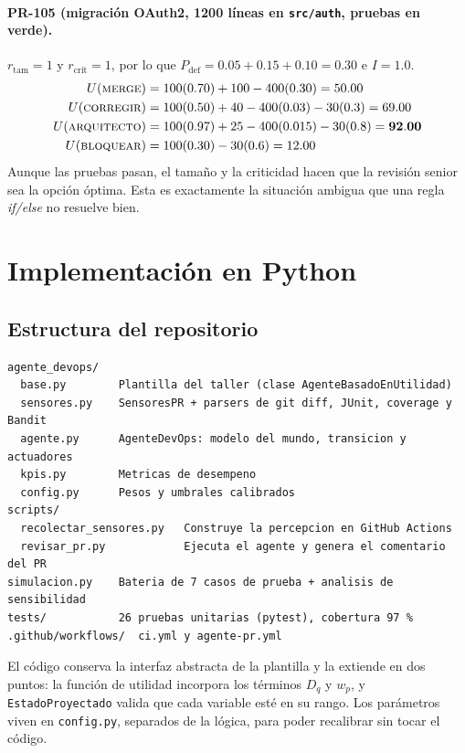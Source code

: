\documentclass[11pt,a4paper]{article}
\newcommand{\Pdef}{P_{\text{def}}}
\begin{document}
\paragraph{PR-105 (migración OAuth2, 1200 líneas en \texttt{src/auth}, pruebas en verde).}
$r_{\text{tam}}=1$ y $r_{\text{crit}}=1$, por lo que $\Pdef = 0.05 + 0.15 + 0.10 = 0.30$ e $I=1.0$.
\begin{align*}
U(\textsc{merge}) &= 100(0.70) + 100 - 400(0.30) = 50.00\\
U(\textsc{corregir}) &= 100(0.50) + 40 - 400(0.03) - 30(0.3) = 69.00\\
U(\textsc{arquitecto}) &= 100(0.97) + 25 - 400(0.015) - 30(0.8) = \mathbf{92.00}\\
U(\textsc{bloquear}) &= 100(0.30) - 30(0.6) = 12.00
\end{align*}
Aunque las pruebas pasan, el tamaño y la criticidad hacen que la revisión senior sea la opción
óptima. Esta es exactamente la situación ambigua que una regla \textit{if/else} no resuelve bien.

\section{Implementación en Python}

\subsection{Estructura del repositorio}

\begin{lstlisting}[language={}, numbers=none]
agente_devops/
  base.py        Plantilla del taller (clase AgenteBasadoEnUtilidad)
  sensores.py    SensoresPR + parsers de git diff, JUnit, coverage y Bandit
  agente.py      AgenteDevOps: modelo del mundo, transicion y actuadores
  kpis.py        Metricas de desempeno
  config.py      Pesos y umbrales calibrados
scripts/
  recolectar_sensores.py   Construye la percepcion en GitHub Actions
  revisar_pr.py            Ejecuta el agente y genera el comentario del PR
simulacion.py    Bateria de 7 casos de prueba + analisis de sensibilidad
tests/           26 pruebas unitarias (pytest), cobertura 97 %
.github/workflows/  ci.yml y agente-pr.yml
\end{lstlisting}

El código conserva la interfaz abstracta de la plantilla y la extiende en dos puntos: la función de
utilidad incorpora los términos $D_q$ y $w_p$, y \texttt{EstadoProyectado} valida que cada variable
esté en su rango. Los parámetros viven en \texttt{config.py}, separados de la lógica, para poder
recalibrar sin tocar el código.
\end{document}
